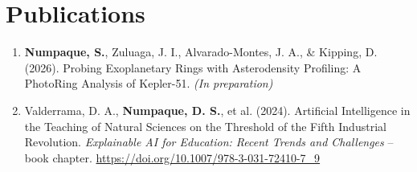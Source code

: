 \section*{Publications}
\begin{enumerate}
    \item \textbf{Numpaque, S.}, Zuluaga, J. I., Alvarado-Montes, J. A., \& Kipping, D. (2026). Probing Exoplanetary Rings with Asterodensity Profiling: A PhotoRing Analysis of Kepler-51. \textit{(In preparation)}
    \item Valderrama, D. A., \textbf{Numpaque, D. S.}, et al. (2024). Artificial Intelligence in the Teaching of Natural Sciences on the Threshold of the Fifth Industrial Revolution. \textit{Explainable AI for Education: Recent Trends and Challenges} -- book chapter. \url{https://doi.org/10.1007/978-3-031-72410-7_9}
\end{enumerate}
